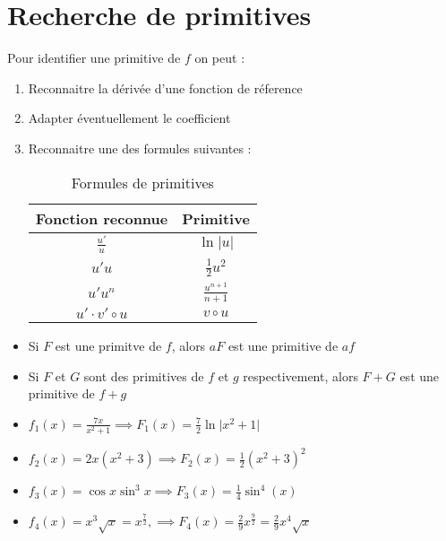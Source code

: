 \section{Recherche de primitives}
Pour identifier une primitive de \(f\) on peut : 
\begin{enumerate}
    \item Reconnaitre la dérivée d'une fonction de réference
    \item Adapter éventuellement le coefficient
    \item Reconnaitre une des formules suivantes : \begin{table}[H]
        \centering
        \begin{tabular}{c|c}
            \toprule
                Fonction reconnue &  Primitive \\
            \midrule
                \(\frac{u'}{u}\)  &  \(\ln \lvert u \rvert \)  \\
                \(u'u\)  &  \(\frac{1}{2}u^{2}\)  \\
                \(u'u^{n}\) &  \(\frac{u^{n+1}}{n+1}\)  \\
                \(u' \cdot v' \circ u\) & \(v \circ u\)  \\
            \bottomrule
        \end{tabular}
        \caption{Formules de primitives}
        \label{tab:primitives}
    \end{table}
\end{enumerate}
\begin{corollary}\label{col:propprim}
    \begin{itemize}
        \item Si \(F\) est une primitve de \(f\), alors \(aF\) est une primitive de \(af\)
        \item Si \(F\) et \(G\) sont des primitives de \(f\) et \(g\) respectivement, alors \(F+G\) est une primitive de \(f+g\)  
    \end{itemize}
\end{corollary}
\begin{eg}[Exemples]\label{eg:primitives}
    \begin{itemize}
        \item \(f_{1}(x) =  \frac{7x}{x^{2}+1} \implies F_{1}(x) = \frac{7}{2} \ln \lvert x^{2}+1 \rvert \) 
        \item \(f_{2}(x) = 2x(x^{2}+3) \implies F_{2}(x) = \frac{1}{2}(x^{2}+3)^{2}\) 
        \item \(f_{3}(x) = \cos x \sin^{3}x \implies F_{3}(x) = \frac{1}{4}\sin^{4}(x)\) 
        \item \(f_{4}(x) = x^{3}\sqrt{x} = x^{\frac{7}{2}}, \implies F_{4}(x) = \frac{2}{9}x^{\frac{9}{2}} = \frac{2}{9}x^{4}\sqrt{x}\)
    \end{itemize}
\end{eg}

